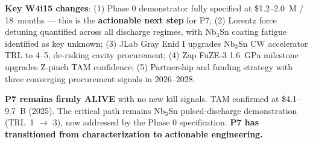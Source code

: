 \documentclass[11pt]{article}
\begin{document}
\textbf{Key W4i15 changes}: (1) Phase 0 demonstrator fully specified
at \$1.2--2.0~M / 18~months --- this is the \textbf{actionable next
step} for P7; (2) Lorentz force detuning quantified across all
discharge regimes, with Nb$_3$Sn coating fatigue identified as key
unknown; (3) JLab Gray Enid I upgrades Nb$_3$Sn CW accelerator TRL
to 4--5, de-risking cavity procurement; (4) Zap FuZE-3 1.6~GPa
milestone upgrades Z-pinch TAM confidence; (5) Partnership and
funding strategy with three converging procurement signals in
2026--2028.

\textbf{P7 remains firmly ALIVE} with no new kill signals. TAM
confirmed at \$4.1--9.7~B (2025). The critical path remains
Nb$_3$Sn pulsed-discharge demonstration (TRL~1 $\to$ 3), now
addressed by the Phase 0 specification. \textbf{P7 has transitioned
from characterization to actionable engineering.}
\end{document}
